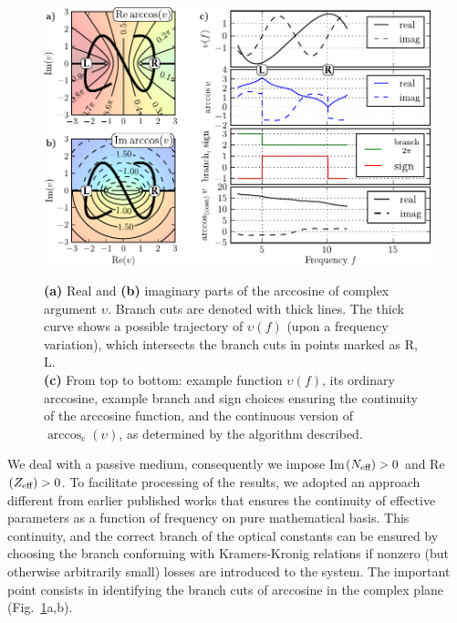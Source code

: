 \begin{figure} \centering \caption{\textbf{(a)} Real and \textbf{(b)} imaginary parts of the arccosine of complex argument $\upsilon$. Branch cuts are denoted with thick lines. The thick curve shows a possible trajectory of  $\upsilon(f)$ (upon a frequency variation), which intersects the branch cuts in points marked as R, L.\\ \textbf{(c)} From top to bottom: example function  $\upsilon(f)$, its ordinary arccosine, example branch and sign choices ensuring the continuity of the arccosine function, and the continuous version of $\arccos_{\mathrm{c}}(\upsilon)$, as determined by the algorithm described.} \includegraphics[width=16cm]{img/continuous_arccos/continuous_arccos_new.pdf} \label{fg_arccos}
\end{figure}
We deal with a passive medium, consequently we impose Im$(N_{\text{eff} })>0$ %
 and Re$(Z_{\text{eff} })>0$. 
To facilitate processing of the results, we adopted an approach different from earlier published works \cite{smith2002determination,chen2004robust}
that ensures the continuity of effective parameters as a function of frequency on pure mathematical basis. This continuity, and the correct branch of the optical constants  %
can be ensured by choosing the branch conforming with
Kramers-Kronig relations if nonzero (but otherwise arbitrarily small) losses are introduced to the system. 
The important point consists in identifying the branch cuts of arccosine in the complex plane (Fig.\ \ref{fg_arccos}a,b). 
